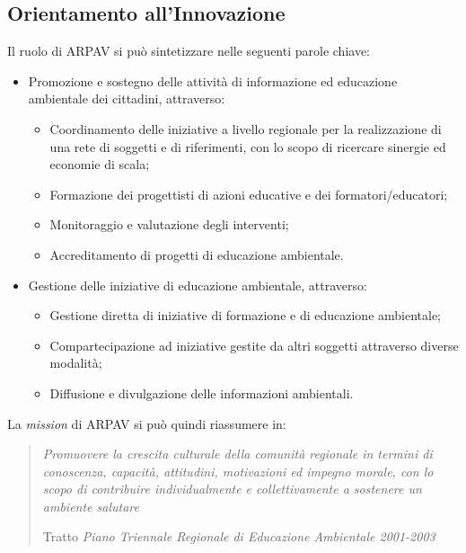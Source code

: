 \subsection{Orientamento all'Innovazione}
Il ruolo di ARPAV si può sintetizzare nelle seguenti parole chiave:
\begin{itemize}


\item Promozione e sostegno
delle attività di informazione ed educazione ambientale dei cittadini, attraverso:
\begin{itemize}
\item Coordinamento delle iniziative a livello regionale per la realizzazione di una rete di soggetti e di riferimenti, con lo scopo di ricercare sinergie ed economie di scala;
\item Formazione dei progettisti di azioni educative e dei formatori/educatori;
\item Monitoraggio e valutazione degli interventi;
\item Accreditamento di progetti di educazione ambientale.
\end{itemize}

\item Gestione delle iniziative di educazione ambientale, attraverso:
\begin{itemize}

\item Gestione diretta di iniziative di formazione e di educazione ambientale;
\item  Compartecipazione ad iniziative gestite da altri soggetti attraverso diverse modalità;
\item  Diffusione e divulgazione delle informazioni ambientali.

\end{itemize}
\end{itemize}
La \textit{mission} di ARPAV si può quindi riassumere in:
\begin{quotation}

\textit{Promuovere la crescita culturale della comunità regionale in termini di conoscenza, capacità, attitudini, motivazioni ed impegno morale, con lo scopo di contribuire individualmente e collettivamente a sostenere un ambiente salutare}
\begin{flushright}
Tratto  \textit{Piano Triennale Regionale di Educazione Ambientale 2001-2003 }
\end{flushright}
\end{quotation}

